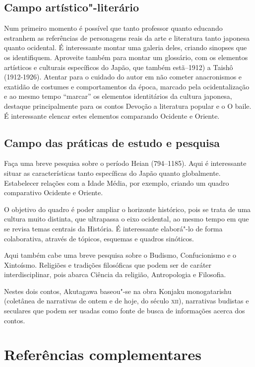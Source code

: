 \documentclass[12pt]{extarticle}
\begin{document}
\subsection{Campo artístico"-literário}

Num primeiro momento é possível que tanto professor quanto educando estranhem
as referências de personagens reais da arte e literatura tanto japonesa quanto
ocidental. É interessante montar uma galeria deles, criando sinopses que os
identifiquem. Aproveite também para montar um glossário, com os elementos
artísticos e culturais específicos do Japão, que também estã--1912) a Taishô
(1912-1926). Atentar para o cuidado do autor em não cometer anacronismos e
exatidão de costumes e comportamentos da época, marcado pela ocidentalização e
ao mesmo tempo ``marcar'' os elementos identitários da cultura japonesa,
destaque principalmente para os contos Devoção a literatura popular e o O
baile. É interessante elencar estes elementos comparando Ocidente e Oriente.

\subsection{Campo das práticas de estudo e pesquisa}


Faça uma breve pesquisa sobre o período Heian (794--1185). Aqui é interessante
situar as características tanto específicas do Japão quanto globalmente.
Estabelecer relações com a Idade Média, por exemplo, criando um quadro
comparativo Ocidente e Oriente.

O objetivo do quadro é poder ampliar o horizonte histórico, pois se trata de
uma cultura muito distinta, que ultrapassa o eixo ocidental, ao mesmo tempo em
que se revisa temas centrais da História. É interessante elaborá"-lo de forma
colaborativa, através de tópicos, esquemas e quadros sinóticos.

Aqui também cabe uma breve pesquisa sobre o Budismo, Confucionismo e o
Xintoísmo. Religiões e tradições filosóficas que podem ser de caráter
interdisciplinar, pois abarca Ciência da religião, Antropologia e Filosofia.

Nestes dois contos, Akutagawa baseou"-se na obra Konjaku monogatarishu
(coletânea de narrativas de ontem e de hoje, do século \textsc{xii}),
narrativas budistas e seculares que podem ser usadas como fonte de busca de
informações acerca dos contos.

\section{Referências complementares}
\end{document}
